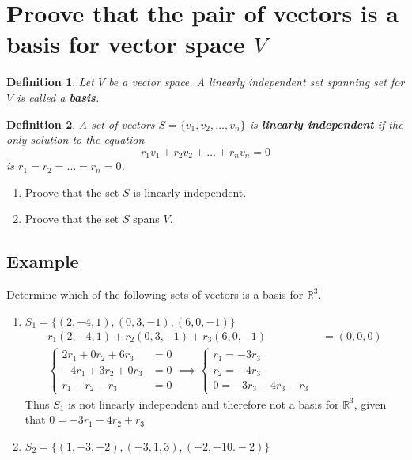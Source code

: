\documentclass[10pt, oneside]{article}
\newcommand{\R}{\mathbb{R}}
\newtheorem{defn}{Definition}
\begin{document}
\section{Proove that the pair of vectors is a basis for vector space $V$}
\begin{defn}
	Let $V$ be a vector space. A  linearly independent set spanning set for $V$ is called a \textbf{basis}.
\end{defn}

\begin{defn}
	A set of vectors $S = \{v_1, v_2, \ldots, v_n\}$ is \textbf{linearly independent} if the only solution to the equation
	\[
		r_1v_1 + r_2v_2 + \ldots + r_nv_n = 0
	\]
	is $r_1 = r_2 = \ldots = r_n = 0$.
\end{defn}
\begin{enumerate}
	\item Proove that the set $S$ is linearly independent.
	\item Proove that the set $S$ spans $V$.
\end{enumerate}

\subsection{Example}
Determine which of the following sets of vectors is a basis for $\R^3$.

\begin{enumerate}
	\item $S_1 = \{(2,-4,1), (0,3,-1), (6,0,-1)\}$
	      \[
		      \begin{split}
			      r_1(2,-4,1) + r_2(0,3,-1) + r_3(6,0,-1) &= (0,0,0) \\
			      \begin{cases}
				      2r_1 + 0r_2 + 6r_3  & = 0 \\
				      -4r_1 + 3r_2 + 0r_3 & = 0 \\
				      r_1 - r_2 - r_3     & = 0
			      \end{cases}
			      \implies \begin{cases}
				      r_1 = -3r_3 \\
				      r_2 = -4r_3 \\
				      0 = -3r_3 - 4r_3 - r_3
			      \end{cases}
		      \end{split}
	      \]
	      Thus $S_1$ is not linearly independent and therefore not a basis for $\R^3$, given
	      that $0 = -3r_1 - 4r_2 + r_3$
	\item $S_2 = \{(1,-3,-2), (-3,1,3), (-2,-10.-2)\}$
\end{enumerate}
\end{document}
